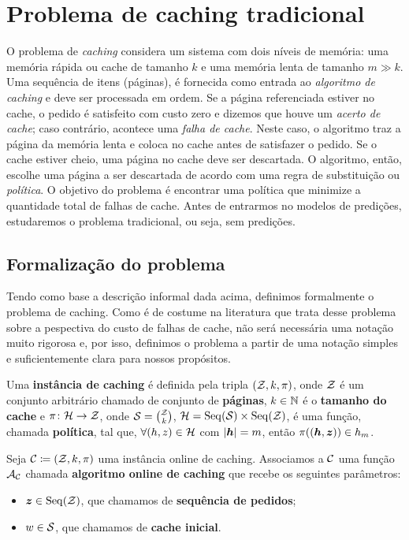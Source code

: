 \chapter{Problema de caching tradicional}

O problema de \emph{caching} considera um sistema com dois níveis de memória: uma memória rápida ou cache de tamanho \(k\) e uma memória lenta de tamanho \(m \gg k\). Uma sequência de itens (páginas), é fornecida como entrada ao \emph{algoritmo de caching} e deve ser processada em ordem. Se a página referenciada estiver no cache, o pedido é satisfeito com custo zero e dizemos que houve um \emph{acerto de cache}; caso contrário, acontece uma \emph{falha de cache}. Neste caso, o algoritmo traz a página da memória lenta e coloca no cache antes de satisfazer o pedido. Se o cache estiver cheio, uma página no cache deve ser descartada. O algoritmo, então, escolhe uma página a ser descartada de acordo com uma regra de substituição ou \emph{política}. O objetivo do problema é encontrar uma política que minimize a quantidade total de falhas de cache. Antes de entrarmos no modelos de predições, estudaremos o problema tradicional, ou seja, sem predições.


\section{Formalização do problema}
Tendo como base a descrição informal dada acima, definimos formalmente o problema de caching. Como é de costume na literatura que trata desse problema sobre a pespectiva do custo de falhas de cache, não será necessária uma notação muito rigorosa e, por isso, definimos o problema a partir de uma notação simples e suficientemente clara para nossos propósitos.

\begin{definition}
  \label{def:cache}
  Uma \textbf{instância de caching} é definida pela tripla \((\mathcal{Z}, k, \pi) \), onde \(\mathcal{Z}\) é um conjunto arbitrário chamado de conjunto de \textbf{páginas}, \(k \in \mathbb{N}\) é o \textbf{tamanho do cache} e \(\pi \colon \mathcal{H} \to \mathcal{Z}\), onde \(\mathcal{S} = \binom{\mathcal{Z}}{k}\), \(\mathcal{H} = \operatorname{Seq}(\mathcal{S}) \times \operatorname{Seq}(\mathcal{Z}) \), é uma função, chamada \textbf{política}, tal que, \(\forall (h,z) \in \mathcal{H}\) com \(|\bm{h}| = m\), então \(\pi((\bm{h},\bm{z})) \in h_m\).
\end{definition}

Seja \(\mathcal{C} \coloneq (\mathcal{Z}, k, \pi)\) uma instância online de caching. Associamos a \(\mathcal{C}\) uma função \(\mathcal{A}_{\mathcal{C}}\) chamada \textbf{algoritmo online de caching} que recebe os seguintes parâmetros:
  \begin{itemize}
    \item \(\bm{z} \in \operatorname{Seq}(\mathcal{Z})\), que chamamos de \textbf{sequência de pedidos};
    \item \(w \in \mathcal{S}\), que chamamos de \textbf{cache inicial}.
  \end{itemize}

